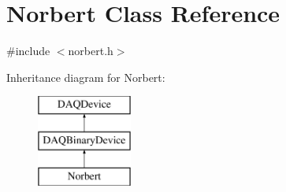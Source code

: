 \hypertarget{classNorbert}{\section{Norbert Class Reference}
\label{classNorbert}
}


{\ttfamily \#include $<$norbert.\-h$>$}

Inheritance diagram for Norbert\-:\begin{figure}[H]
\begin{center}
\leavevmode
\includegraphics[height=3.000000cm]{classNorbert}
\end{center}
\end{figure}
